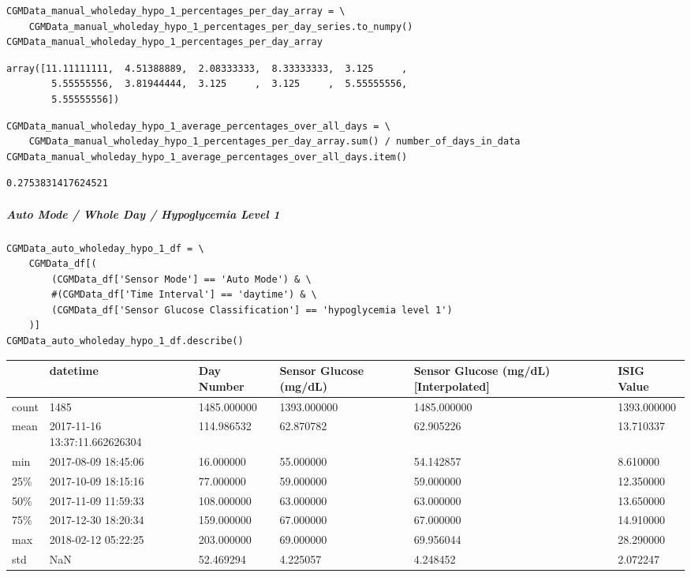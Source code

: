 \begin{verbatim}
CGMData_manual_wholeday_hypo_1_percentages_per_day_array = \
    CGMData_manual_wholeday_hypo_1_percentages_per_day_series.to_numpy()
CGMData_manual_wholeday_hypo_1_percentages_per_day_array
\end{verbatim}

\begin{verbatim}
array([11.11111111,  4.51388889,  2.08333333,  8.33333333,  3.125     ,
        5.55555556,  3.81944444,  3.125     ,  3.125     ,  5.55555556,
        5.55555556])
\end{verbatim}

\begin{verbatim}
CGMData_manual_wholeday_hypo_1_average_percentages_over_all_days = \
    CGMData_manual_wholeday_hypo_1_percentages_per_day_array.sum() / number_of_days_in_data
CGMData_manual_wholeday_hypo_1_average_percentages_over_all_days.item()
\end{verbatim}

\begin{verbatim}
0.2753831417624521
\end{verbatim}

\subparagraph{Auto Mode / Whole Day / Hypoglycemia Level 1}

\begin{verbatim}
CGMData_auto_wholeday_hypo_1_df = \
    CGMData_df[(
        (CGMData_df['Sensor Mode'] == 'Auto Mode') & \
        #(CGMData_df['Time Interval'] == 'daytime') & \
        (CGMData_df['Sensor Glucose Classification'] == 'hypoglycemia level 1')
    )]
CGMData_auto_wholeday_hypo_1_df.describe()
\end{verbatim}

\bigskip\noindent
\begin{tabular}{p{}p{}p{}p{}p{}p{}}
\toprule
 & datetime & Day Number & Sensor Glucose (mg/dL) & Sensor Glucose (mg/dL) [Interpolated] & ISIG Value \\
\hline
count & 1485 & 1485.000000 & 1393.000000 & 1485.000000 & 1393.000000 \\
\hline
mean & 2017-11-16 13:37:11.662626304 & 114.986532 & 62.870782 & 62.905226 & 13.710337 \\
\hline
min & 2017-08-09 18:45:06 & 16.000000 & 55.000000 & 54.142857 & 8.610000 \\
\hline
25\% & 2017-10-09 18:15:16 & 77.000000 & 59.000000 & 59.000000 & 12.350000 \\
\hline
50\% & 2017-11-09 11:59:33 & 108.000000 & 63.000000 & 63.000000 & 13.650000 \\
\hline
75\% & 2017-12-30 18:20:34 & 159.000000 & 67.000000 & 67.000000 & 14.910000 \\
\hline
max & 2018-02-12 05:22:25 & 203.000000 & 69.000000 & 69.956044 & 28.290000 \\
\hline
std & NaN & 52.469294 & 4.225057 & 4.248452 & 2.072247 \\
\hline
\bottomrule
\end{tabular}

